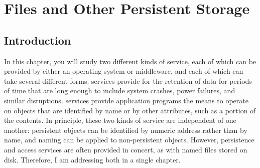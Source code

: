\newcommand{\persistenceChapterTitle}{Files and Other Persistent Storage}
\chapter{\persistenceChapterTitle}
\label{persistence-chapter}

\section{Introduction}

In this chapter, you will study two different kinds of service, each of
which can be provided by either an operating system or middleware, and
each of which can take several different forms.   services
provide for the retention of data for periods of time that are long
enough to include system crashes, power failures, and similar
disruptions.   services provide application
programs the means to operate on objects that
are identified by name or by other attributes, such as a portion of the
contents.  In principle, these two kinds of service are independent of
one another: persistent objects can be identified by numeric
address rather than by name, and naming can be applied to
non-persistent objects.  However, persistence and access services are
often provided in concert, as with named files stored on disk.
Therefore, I am addressing both in a single chapter.

